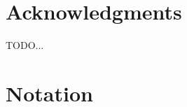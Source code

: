 
\newpage\thispagestyle{empty}
\chapter*{Acknowledgments}

\sloppy
TODO...


\newpage\thispagestyle{empty}

\ifnotsu{\setlength{\cftbeforechapterskip}{0.5em}}

\tableofcontents


\chapter*{Notation}



\mainmatter







% 
\setcounter{footnote}{0}
\def\thefootnote{\fnsymbol{footnote}}
\def\bibpreamble{{\normalsize \emph{Note.---} All references that are publicly available on the Internet have archival versions at the Wayback Machine.%
  \footnote{\url{https://web.archive.org}}}}
\small



